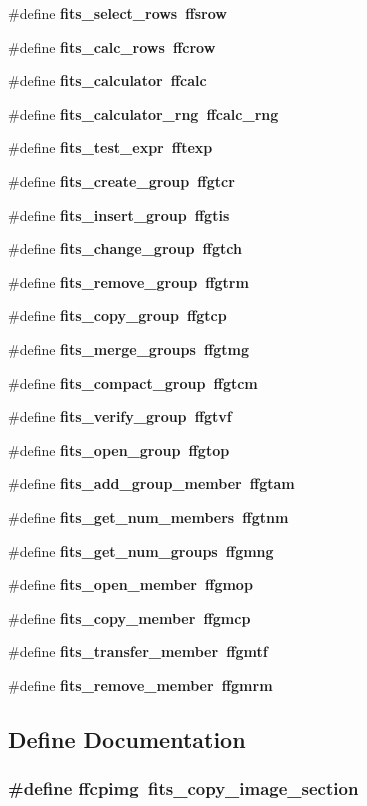 \begin{CompactItemize}
\#define \bf{fits\_\-select\_\-rows}~ffsrow
\item 
\#define \bf{fits\_\-calc\_\-rows}~ffcrow
\item 
\#define \bf{fits\_\-calculator}~ffcalc
\item 
\#define \bf{fits\_\-calculator\_\-rng}~ffcalc\_\-rng
\item 
\#define \bf{fits\_\-test\_\-expr}~fftexp
\item 
\#define \bf{fits\_\-create\_\-group}~ffgtcr
\item 
\#define \bf{fits\_\-insert\_\-group}~ffgtis
\item 
\#define \bf{fits\_\-change\_\-group}~ffgtch
\item 
\#define \bf{fits\_\-remove\_\-group}~ffgtrm
\item 
\#define \bf{fits\_\-copy\_\-group}~ffgtcp
\item 
\#define \bf{fits\_\-merge\_\-groups}~ffgtmg
\item 
\#define \bf{fits\_\-compact\_\-group}~ffgtcm
\item 
\#define \bf{fits\_\-verify\_\-group}~ffgtvf
\item 
\#define \bf{fits\_\-open\_\-group}~ffgtop
\item 
\#define \bf{fits\_\-add\_\-group\_\-member}~ffgtam
\item 
\#define \bf{fits\_\-get\_\-num\_\-members}~ffgtnm
\item 
\#define \bf{fits\_\-get\_\-num\_\-groups}~ffgmng
\item 
\#define \bf{fits\_\-open\_\-member}~ffgmop
\item 
\#define \bf{fits\_\-copy\_\-member}~ffgmcp
\item 
\#define \bf{fits\_\-transfer\_\-member}~ffgmtf
\item 
\#define \bf{fits\_\-remove\_\-member}~ffgmrm
\end{CompactItemize}


\subsection{Define Documentation}
\subsubsection{\setlength{\rightskip}{0pt plus 5cm}\#define ffcpimg~fits\_\-copy\_\-image\_\-section}\label{longnam__64_8h_421f404476b1124203a4959cfe5ffa55}


